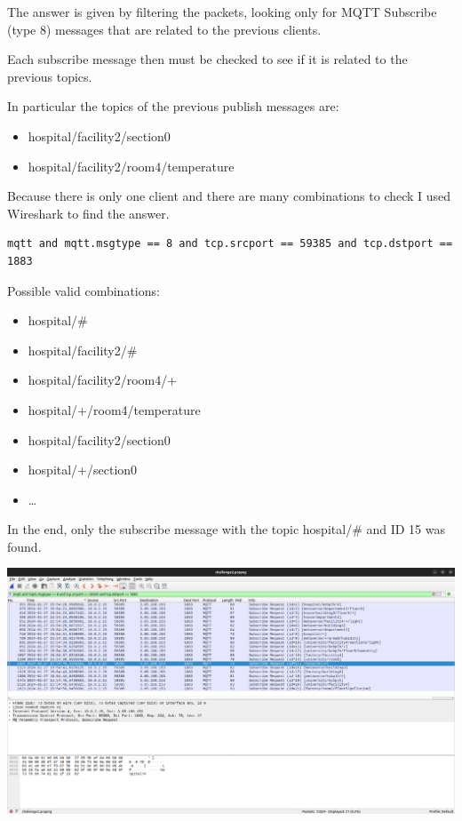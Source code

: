 \documentclass[11pt]{article}
\providecommand{\tightlist}{%
      \setlength{\itemsep}{0pt}\setlength{\parskip}{0pt}}
\begin{document}
The answer is given by filtering the packets, looking only for MQTT
Subscribe (type 8) messages that are related to the previous clients.

Each subscribe message then must be checked to see if it is related to
the previous topics.

In particular the topics of the previous publish messages are:

\begin{itemize}
\tightlist
\item
  hospital/facility2/section0
\item
  hospital/facility2/room4/temperature
\end{itemize}

Because there is only one client and there are many combinations to
check I used Wireshark to find the answer.

\begin{verbatim}
mqtt and mqtt.msgtype == 8 and tcp.srcport == 59385 and tcp.dstport == 1883
\end{verbatim}

Possible valid combinations:

\begin{itemize}
\tightlist
\item
  hospital/\#
\item
  hospital/facility2/\#
\item
  hospital/facility2/room4/+
\item
  hospital/+/room4/temperature
\item
  hospital/facility2/section0
\item
  hospital/+/section0
\item
  \ldots{}
\end{itemize}

In the end, only the subscribe message with the topic hospital/\# and ID
15 was found.

    \includegraphics{3c.png}
\end{document}
